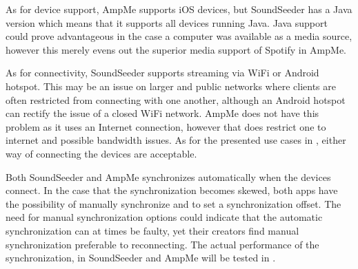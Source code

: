 As for device support, AmpMe supports iOS devices, but SoundSeeder has a Java version which means that it supports all devices running Java.
Java support could prove advantageous in the case a computer was available as a media source, however this merely evens out the superior media support of Spotify in AmpMe.

As for connectivity, SoundSeeder supports streaming via WiFi or Android hotspot.
This may be an issue on larger and public networks where clients are often restricted from connecting with one another, although an Android hotspot can rectify the issue of a closed WiFi network.
AmpMe does not have this problem as it uses an Internet connection, however that does restrict one to internet and possible bandwidth issues.
As for the presented use cases in , either way of connecting the devices are acceptable.

Both SoundSeeder and AmpMe synchronizes automatically when the devices connect.
In the case that the synchronization becomes skewed, both apps have the possibility of manually synchronize and to set a synchronization offset.
The need for manual synchronization options could indicate that the automatic synchronization can at times be faulty, yet their creators find manual synchronization preferable to reconnecting.
The actual performance of the synchronization, in SoundSeeder and AmpMe will be tested in .

